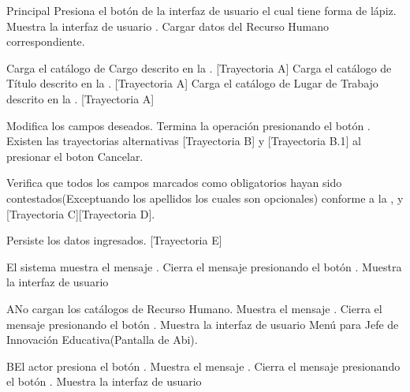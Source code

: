 \begin{UCtrayectoria}{Principal}
    \UCpaso[\UCactor] Presiona el botón  de la interfaz de usuario  el cual tiene forma de lápiz.
    \UCpaso Muestra la interfaz de usuario .
    \UCpaso Cargar datos del Recurso Humano correspondiente.

    \UCpaso Carga el catálogo de Cargo descrito en la . [Trayectoria A]
    \UCpaso Carga el catálogo de Título descrito en la . [Trayectoria A]
    \UCpaso Carga el catálogo de Lugar de Trabajo descrito en la . [Trayectoria A]

    \UCpaso[\UCactor] Modifica los campos deseados.
    \UCpaso[\UCactor] Termina la operación presionando el botón .  Existen las trayectorias alternativas [Trayectoria B] y [Trayectoria B.1] al presionar el boton Cancelar.

    \UCpaso Verifica que todos los campos marcados como obligatorios hayan sido contestados(Exceptuando los apellidos los cuales son opcionales) conforme a la , y [Trayectoria C][Trayectoria D].

    \UCpaso Persiste los datos ingresados. [Trayectoria E]

    \UCpaso El sistema muestra el mensaje .
    \UCpaso[\UCactor] Cierra el mensaje presionando el botón .
    \UCpaso Muestra la interfaz de usuario 
\end{UCtrayectoria}
\begin{UCtrayectoriaA}{A}{No cargan los catálogos de Recurso Humano.}
    \UCpaso Muestra el mensaje .
    \UCpaso[\UCactor] Cierra el mensaje presionando el botón .
\UCpaso Muestra la interfaz de usuario Menú para Jefe de Innovación Educativa(Pantalla de Abi).
\end{UCtrayectoriaA}
\begin{UCtrayectoriaA}{B}{El actor presiona el botón .}
    \UCpaso Muestra el mensaje .
    \UCpaso[\UCactor] Cierra el mensaje presionando el botón .
    \UCpaso Muestra la interfaz de usuario 
\end{UCtrayectoriaA}
